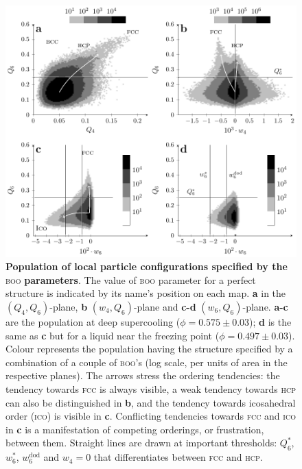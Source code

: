 \clearpage

\begin{figure}
\begin{center}
\includegraphics{fig_maps.pdf}
\end{center}
\caption{\textbf{Population of local particle configurations specified by the }\textsc{boo}\textbf{ parameters}. The value of \textsc{boo} parameter for a perfect structure is  indicated by its name's position on each map. \textbf{a} in the $(Q_4,Q_6)$-plane, \textbf{b} $(w_4,Q_6)$-plane and \textbf{c-d} $(w_6,Q_6)$-plane. \textbf{a-c} are the population at deep supercooling ($\phi=0.575\pm 0.03$); \textbf{d} is the same as \textbf{c} but for a liquid near the freezing point ($\phi = 0.497 \pm 0.03$). Colour represents the population having the structure  specified by a combination of a couple of \textsc{boo}'s (log scale, per units of area in the respective planes). The arrows stress the ordering tendencies: the tendency towards \textsc{fcc} is always visible, a weak tendency towards \textsc{hcp} can also be distinguished in \textbf{b}, and the tendency towards icosahedral order (\textsc{ico}) is visible in \textbf{c}. 
Conflicting tendencies towards \textsc{fcc} and \textsc{ico} in \textbf{c} is a manifestation of competing orderings, or frustration, between them. Straight lines are drawn at important thresholds: $Q_6^*$, $w_6^*$, $w_6^\text{dod}$ and $w_4=0$ that differentiates between \textsc{fcc} and \textsc{hcp}.}
	\label{fig:maps}
\end{figure}

